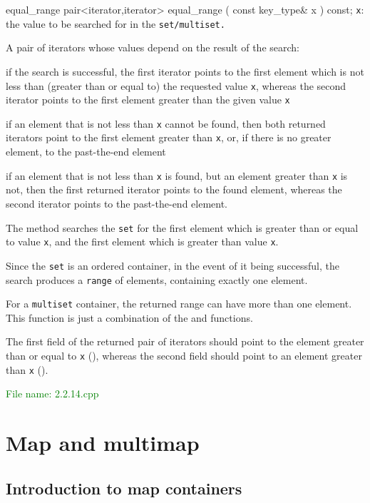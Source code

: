 \begin{methodinfo}
  {equal_range}
  {pair<iterator,iterator> equal_range ( const key_type& x ) const;}
  {\texttt{x}: the value to be searched for in the \texttt{set/multiset.}}
  {A pair of iterators whose values depend on the result of the search:

  if the search is successful, the first iterator points to the first element which is not less than 
  (greater than or equal to) the requested value \texttt{x}, whereas the second iterator points to 
  the first element greater than the given value \texttt{x}

  if an element that is not less than \texttt{x} cannot be found, then both returned iterators point to the 
  first element greater than \texttt{x}, or, if there is no greater element, to the past-the-end element

  if an element that is not less than \texttt{x} is found, but an element greater than \texttt{x} is not, 
  then the first returned iterator points to the found element, whereas the second iterator points to 
  the past-the-end element.}
  {The method  searches the \texttt{set} for the first element which is 
  greater than or equal to value \texttt{x}, and the first element which is greater than value \texttt{x}.

  Since the \texttt{set} is an ordered container, in the event of it being successful, the search produces 
  a \texttt{range} of elements, containing exactly one element.

  For a \texttt{multiset} container, the returned range can have more than one element. This function is 
  just a combination of the  and  functions.


  The first field of the returned pair of iterators should point to the element greater than or 
  equal to \texttt{x} (), whereas the second field should point to 
  an element greater than \texttt{x} ().}
\end{methodinfo}

\textcolor{green}{File name: 2.2.14.cpp} 
 

\section{Map and multimap} %
\subsection{Introduction to map containers} %

























